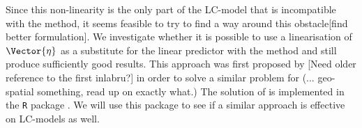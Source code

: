 Since this non-linearity is the only part of the LC-model that is incompatible with the \inla method, it seems feasible to try to find a way around this obstacle[find better formulation]. We investigate whether it is possible to use a linearisation of $\Vector{\eta}$ as a substitute for the linear predictor with the \inla method and still produce sufficiently good results. This approach was first proposed by \cite{Inlabru} [Need older reference to the first inlabru?] in order to solve a similar problem for (... geo-spatial something, read up on exactly what.) The solution of \cite{Inlabru} is implemented in the \texttt{R} package \inlabru. We will use this package to see if a similar approach is effective on LC-models as well.     

